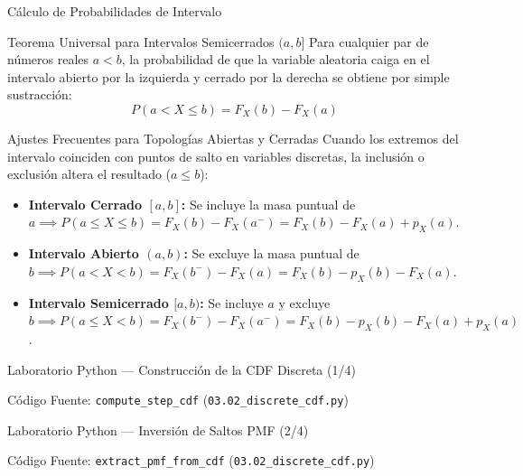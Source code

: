 \documentclass[10pt, aspectratio=169]{beamer}
\begin{document}
\begin{frame}{Cálculo de Probabilidades de Intervalo}
  \fontsize{7pt}{8.4pt}\selectfont
  \begin{block}{Teorema Universal para Intervalos Semicerrados $(a, b]$}
    \fontsize{7pt}{8.4pt}\selectfont
    Para cualquier par de números reales $a < b$, la probabilidad de que la variable aleatoria caiga en el intervalo abierto por la izquierda y cerrado por la derecha se obtiene por simple sustracción:
    $$P(a < X \le b) = F_X(b) - F_X(a)$$
  \end{block}
  \vspace{-0.15cm}
  \pause
  \begin{alertblock}{Ajustes Frecuentes para Topologías Abiertas y Cerradas}
    \fontsize{6.8pt}{8.0pt}\selectfont
    Cuando los extremos del intervalo coinciden con puntos de salto en variables discretas, la inclusión o exclusión altera el resultado ($a \le b$):
    \begin{itemize}\itemsep=0.06cm
      \item \textbf{Intervalo Cerrado $[a, b]$:} Se incluye la masa puntual de $a \implies \displaystyle P(a \le X \le b) = F_X(b) - F_X(a^-) = F_X(b) - F_X(a) + p_X(a)$.
      \item \textbf{Intervalo Abierto $(a, b)$:} Se excluye la masa puntual de $b \implies \displaystyle P(a < X < b) = F_X(b^-) - F_X(a) = F_X(b) - p_X(b) - F_X(a)$.
      \item \textbf{Intervalo Semicerrado $[a, b)$:} Se incluye $a$ y excluye $b \implies \displaystyle P(a \le X < b) = F_X(b^-) - F_X(a^-) = F_X(b) - p_X(b) - F_X(a) + p_X(a)$.
    \end{itemize}
  \end{alertblock}
\end{frame}

\begin{frame}[fragile]{Laboratorio Python — Construcción de la CDF Discreta (1/4)}
  \begin{block}{Código Fuente: \texttt{compute\_step\_cdf} (\texttt{03.02\_discrete\_cdf.py})}
    \fontsize{6.5pt}{7.5pt}\selectfont
    
  \end{block}
\end{frame}

\begin{frame}[fragile]{Laboratorio Python — Inversión de Saltos PMF (2/4)}
  \begin{block}{Código Fuente: \texttt{extract\_pmf\_from\_cdf} (\texttt{03.02\_discrete\_cdf.py})}
    \fontsize{6.5pt}{7.5pt}\selectfont
    
  \end{block}
\end{frame}
\end{document}
